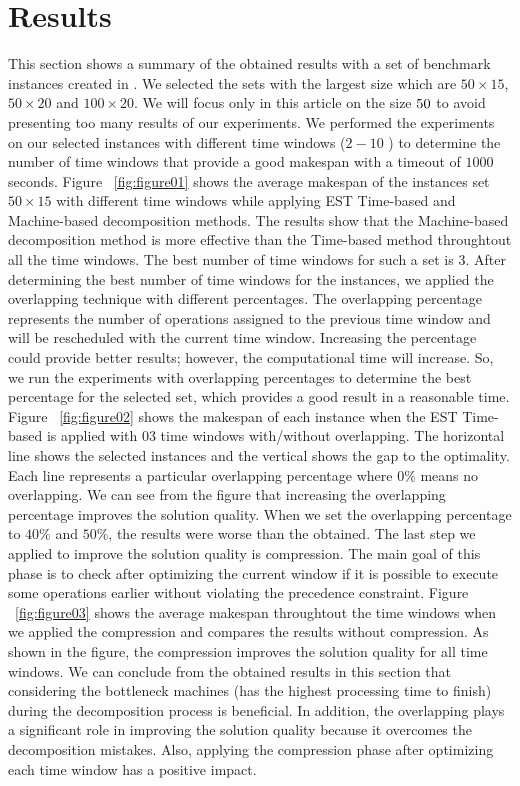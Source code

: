 \documentclass[submission,copyright,creativecommons]{eptcs}
\begin{document}
\section{Results}
This section shows a summary of the obtained results with a set of benchmark instances created in \cite{taillard1993benchmarks}. We selected the sets with the largest size which are $50\times15$, $50\times20$ and $100\times20$. We will focus only in this article on the size $50\time15$ to avoid presenting too many results of our experiments. We performed the experiments on our selected instances with different time windows ($2 - 10$ ) to determine the number of time windows that provide a good makespan with a timeout of $1000$ seconds. Figure ~\ref{fig:figure01} shows the average makespan of the instances set $50\times15$ with different time windows while applying EST Time-based and Machine-based decomposition methods. The results show that the Machine-based decomposition method is more effective than the Time-based method throughtout all the time windows. The best number of time windows for such a set is $3$. After determining the best number of time windows for the instances, we applied the overlapping technique with different percentages.
The overlapping percentage represents the number of operations assigned to the previous time window and will be rescheduled with the current time window. Increasing the percentage could provide better results; however, the computational time will increase. So, we run the experiments with overlapping percentages to determine the best percentage for the selected set, which provides a good result in a reasonable time. Figure ~\ref{fig:figure02} shows the makespan of each instance when the EST Time-based is applied with $03$ time windows with/without overlapping. The horizontal line shows the selected instances and the vertical shows the gap to the optimality. Each line represents a particular overlapping percentage where $0\%$ means no overlapping. We can see from the figure that increasing the overlapping percentage improves the solution quality. When we set the overlapping percentage to $40\%$ and $50\%$, the results were worse than the obtained. The last step we applied to improve the solution quality is compression. The main goal of this phase is to check after optimizing the current window if it is possible to execute some operations earlier without violating the precedence constraint. Figure ~\ref{fig:figure03} shows the average makespan throughtout the time windows when we applied the compression and compares the results without compression. As shown in the figure, the compression improves the solution quality for all time windows. We can conclude from the obtained results in this section that considering the bottleneck machines (has the highest processing time to finish) during the decomposition process is beneficial. In addition, the overlapping plays a significant role in improving the solution quality because it overcomes the decomposition mistakes. Also, applying the compression phase after optimizing each time window has a positive impact. 
\end{document}
